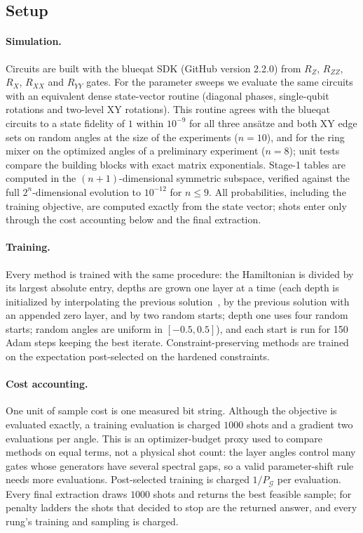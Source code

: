 \subsection{Setup}
\paragraph{Simulation.} Circuits are built with the blueqat SDK (GitHub version 2.2.0) from $R_Z$, $R_{ZZ}$, $R_X$, $R_{XX}$ and $R_{YY}$ gates.
For the parameter sweeps we evaluate the same circuits with an equivalent dense state-vector routine (diagonal phases, single-qubit
rotations and two-level XY rotations). This routine agrees with the blueqat circuits to a state fidelity of $1$ within $10^{-9}$ for all
three ans\"atze and both XY edge sets on random angles at the size of the experiments ($n=10$), and for the ring mixer on the optimized angles of a preliminary
experiment ($n=8$); unit tests compare the building blocks with exact matrix exponentials. Stage-1 tables are computed in the $(n+1)$-dimensional symmetric subspace, verified against the full
$2^n$-dimensional evolution to $10^{-12}$ for $n\le9$. All probabilities, including the training objective, are computed exactly from the state vector; shots enter only through the cost accounting below and the final extraction.

\paragraph{Training.} Every method is trained with the same procedure: the Hamiltonian is divided by its largest absolute entry,
depths are grown one layer at a time (each depth is initialized by interpolating the previous solution~\cite{zhou2020qaoa}, by the
previous solution with an appended zero layer, and by two random starts; depth one uses four random starts; random angles are uniform in $[-0.5,0.5]$), and each start is run for 150 Adam steps keeping the best
iterate. Constraint-preserving methods are trained on the expectation post-selected on the hardened constraints.

\paragraph{Cost accounting.} One unit of sample cost is one measured bit string. Although the objective is evaluated exactly, a training evaluation is charged $1000$ shots and a
gradient two evaluations per angle. This is an optimizer-budget proxy used to compare methods on equal terms, not a physical shot count: the layer angles control many gates whose generators have several spectral gaps, so a valid parameter-shift rule needs more evaluations. Post-selected
training is charged $1/P_{\mathcal G}$ per evaluation. Every final extraction draws $1000$ shots and returns the best feasible sample;
for penalty ladders the shots that decided to stop are the returned answer, and every rung's training and sampling is charged.

